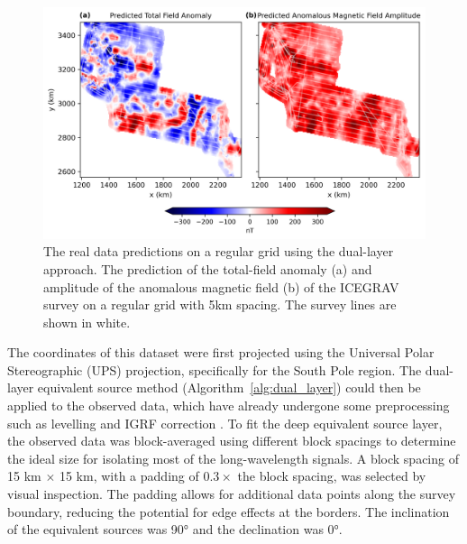 \begin{figure}[tb!]
\centering
\includegraphics[width=1\linewidth]{figures/real_grid_pred.png}
\caption{
    The real data predictions on a regular grid using the dual-layer approach. The prediction of the total-field anomaly (a) and amplitude of the anomalous magnetic field (b) of the ICEGRAV survey \citep{ICEGRAV_data} on a regular grid with 5km spacing. The survey lines are shown in white.
}
\label{fig:real_grid_pred}
\end{figure}

The coordinates of this dataset were first projected using the Universal Polar Stereographic (UPS) projection, specifically for the South Pole region. The dual-layer equivalent source method (Algorithm~\ref{alg:dual_layer}) could then be applied to the observed data, which have already undergone some preprocessing such as levelling and IGRF correction \citep{ICEGRAV_data}. To fit the deep equivalent source layer, the observed data was block-averaged using different block spacings to determine the ideal size for isolating most of the long-wavelength signals. A block spacing of 15 km $\times$ 15 km, with a padding of $ 0.3 \times $ the block spacing, was selected by visual inspection. The padding allows for additional data points along the survey boundary, reducing the potential for edge effects at the borders.
The inclination of the equivalent sources was \ang{90} and the declination was \ang{0}.

